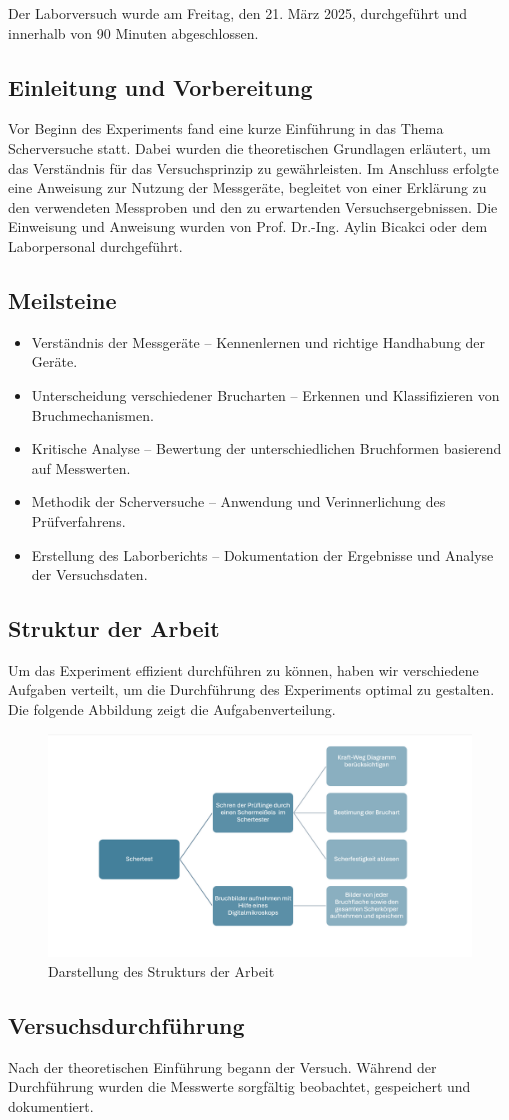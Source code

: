 Der Laborversuch wurde am Freitag, den 21. März 2025, durchgeführt und innerhalb von 90 Minuten abgeschlossen.
\subsection{Einleitung und Vorbereitung}
Vor Beginn des Experiments fand eine kurze Einführung in das Thema Scherversuche statt. Dabei wurden die theoretischen Grundlagen erläutert, um das Verständnis für das Versuchsprinzip zu gewährleisten.
Im Anschluss erfolgte eine Anweisung zur Nutzung der Messgeräte, begleitet von einer Erklärung zu den verwendeten Messproben und den zu erwartenden Versuchsergebnissen.
Die Einweisung und Anweisung wurden von Prof. Dr.-Ing. Aylin Bicakci oder dem Laborpersonal durchgeführt.
\subsection{Meilsteine}
\begin{itemize}
    \item Verständnis der Messgeräte – Kennenlernen und richtige Handhabung der Geräte.
    \item Unterscheidung verschiedener Brucharten – Erkennen und Klassifizieren von Bruchmechanismen.
    \item Kritische Analyse – Bewertung der unterschiedlichen Bruchformen basierend auf Messwerten.
    \item Methodik der Scherversuche – Anwendung und Verinnerlichung des Prüfverfahrens.
    \item Erstellung des Laborberichts – Dokumentation der Ergebnisse und Analyse der Versuchsdaten.
\end{itemize}
\subsection{Struktur der Arbeit}
Um das Experiment effizient durchführen zu können, haben wir verschiedene Aufgaben verteilt, um die Durchführung des Experiments optimal zu gestalten. Die folgende Abbildung zeigt die Aufgabenverteilung.
\begin{figure}[h]
    \centering
    \includegraphics[scale=0.8]{Bilder/Struktur der Arbeit.png}
    \caption{Darstellung des Strukturs der Arbeit}
    \label{Abb. :Darstellung des Strukturs der Arbeit}
\end{figure}
\subsection{Versuchsdurchführung}
Nach der theoretischen Einführung begann der Versuch. Während der Durchführung wurden die Messwerte sorgfältig beobachtet, gespeichert und dokumentiert.
